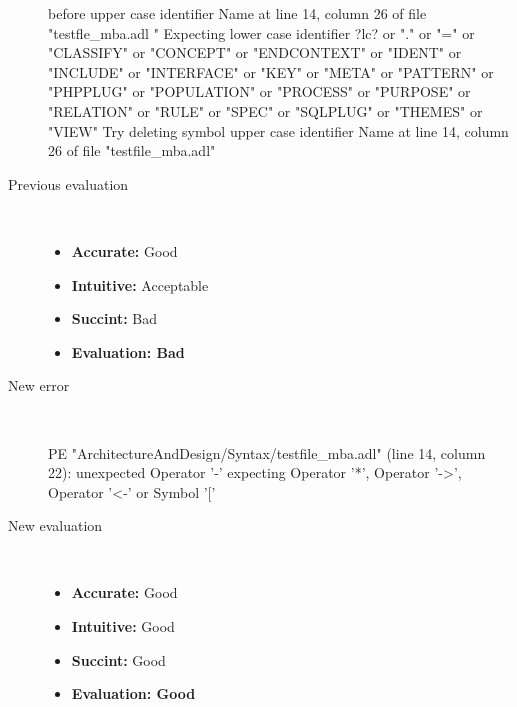 \begin{description}
\begin{haskell}
before upper case identifier Name at line 14, column 26 of file "testfle_mba.adl
" Expecting lower case identifier ?lc? or "." or "=" or "CLASSIFY" or "CONCEPT" or  "ENDCONTEXT" or "IDENT" or "INCLUDE" or "INTERFACE" or "KEY" or "META" or "PATTERN" or "PHPPLUG" or "POPULATION" or "PROCESS" or "PURPOSE" or "RELATION" or "RULE" or "SPEC" or "SQLPLUG" or "THEMES" or "VIEW"
Try deleting symbol upper case identifier Name at line 14, column 26 of file "testfile_mba.adl"\end{haskell}
  \item[Previous evaluation]~\\
    \begin{itemize}
    \item \textbf{Accurate:} Good
    \item \textbf{Intuitive:} Acceptable
    \item \textbf{Succint:} Bad
    \item \textbf{Evaluation: Bad}
    \end{itemize}
  \item[New error]~\\
\begin{haskell}
PE "ArchitectureAndDesign/Syntax/testfile_mba.adl" (line 14, column 22):
unexpected Operator '-'
expecting Operator '*', Operator '->', Operator '<-' or Symbol '['\end{haskell}
  \item[New evaluation]~\\
    \begin{itemize}
    \item \textbf{Accurate:} Good
    \item \textbf{Intuitive:} Good
    \item \textbf{Succint:} Good
    \item \textbf{Evaluation: Good
}
    \end{itemize}
  \end{description}

\hrulefill

